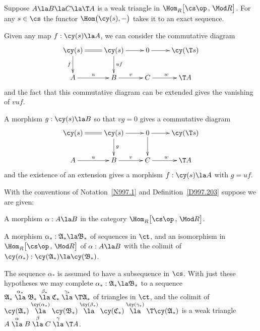 \documentclass[11pt]{amsart}
\begin{document}
Suppose $A\la B\la C\la\T A$ is a weak triangle in
$\Hom_R^{}\big[\cs\op\,,\,\Mod R\big]$. For any
$s\in\cs$ the functor $\Hom\big(\cy(s),-\big)$ takes it to an exact sequence.
\elem

\prf
Given any map $f:\cy(s)\la A$, we can consider the
commutative diagram
  \[\xymatrix{
    \cy(s)\ar@{=}[r]\ar[d]_-{f} & \cy(s)\ar[r]\ar[d]^{uf} &
    0\ar[r] & \cy(\T s) \\
A\ar[r]^{u} & B\ar[r]^{v} &
    C\ar[r]^{w} & \T A 
  }\]
  and the fact that this commutative diagram can be extended gives
  the vanishing of $vuf$.
  
A morphism $g:\cy(s)\la B$ so that $vg=0$ gives a
commutative diagram
  \[\xymatrix{
    \cy(s)\ar@{=}[r] & \cy(s)\ar[r]\ar[d]^{g} &
    0\ar[r]\ar[d] & \cy(\T s) \\
A\ar[r]^{u} & B\ar[r]^{v} &
    C\ar[r]^{w} & \T A 
  }\]
and the existence of an extension gives a morphism $f:\cy(s)\la A$ with
$g=uf$. 
\eprf


With the conventions of Notation~\ref{N997.1}
and Definition~\ref{D997.203}
suppose we are given:
\be
\item
A morphism
$\alpha: A\la B$ in the category $\Hom_R^{}\big[\cs\op\,,\,\Mod R\big]$.  
\item
A morphism $\alpha_*:\mathfrak{A}_*\la\mathfrak{B}_*$ of sequences in $\ct$,
and an isomorphism in $\Hom_R^{}\big[\cs\op\,,\,\Mod R\big]$ of
$\alpha:A\la B$ with the colimit of
$\cy(\alpha_*):\cy(\mathfrak{A}_*)\la\cy(\mathfrak{B}_*)$.
\item
The sequence $\alpha_*$ is assumed to have a subsequence in $\cs$.
\setcounter{enumiv}{\value{enumi}}
\ee
With just these hypotheses we may complete
$\alpha_*:\mathfrak{A}_*\la\mathfrak{B}_*$ to a sequence
$\mathfrak{A}_*\stackrel{\alpha_*}\la\mathfrak{B}_*\stackrel{\beta_*}\la\mathfrak{C}_*\stackrel{\gamma_*}\la\T\mathfrak{A}_*$
of triangles
in $\ct$,
and the colimit
of
$\cy(\mathfrak{A}_*)\stackrel{\cy(\alpha_*)}\la\cy(\mathfrak{B}_*)\stackrel{\cy(\beta_*)}\la\cy(\mathfrak{C}_*)\stackrel{\cy(\gamma_*)}\la\T\cy(\mathfrak{A}_*)$
is a weak triangle 
$A\stackrel{\alpha}\la B\stackrel{\beta}\la C\stackrel{\gamma}\la \T A$.
\end{document}

